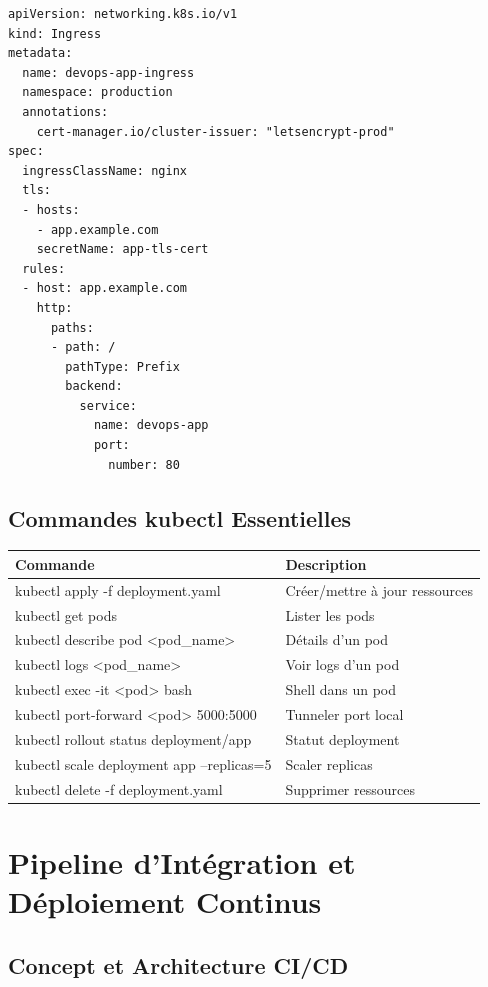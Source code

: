 \documentclass[12pt,a4paper]{report}
\begin{document}
\lstset{language=yaml}
\begin{lstlisting}
apiVersion: networking.k8s.io/v1
kind: Ingress
metadata:
  name: devops-app-ingress
  namespace: production
  annotations:
    cert-manager.io/cluster-issuer: "letsencrypt-prod"
spec:
  ingressClassName: nginx
  tls:
  - hosts:
    - app.example.com
    secretName: app-tls-cert
  rules:
  - host: app.example.com
    http:
      paths:
      - path: /
        pathType: Prefix
        backend:
          service:
            name: devops-app
            port:
              number: 80
\end{lstlisting}

\section{Commandes kubectl Essentielles}

\begin{table}[H]
\centering
\begin{tabularx}{\linewidth}{|l|X|}
\hline
\textbf{Commande} & \textbf{Description} \\
\hline
kubectl apply -f deployment.yaml & Créer/mettre à jour ressources \\
kubectl get pods & Lister les pods \\
kubectl describe pod <pod\_name> & Détails d'un pod \\
kubectl logs <pod\_name> & Voir logs d'un pod \\
kubectl exec -it <pod> bash & Shell dans un pod \\
kubectl port-forward <pod> 5000:5000 & Tunneler port local \\
kubectl rollout status deployment/app & Statut deployment \\
kubectl scale deployment app --replicas=5 & Scaler replicas \\
kubectl delete -f deployment.yaml & Supprimer ressources \\
\hline
\end{tabularx}
\end{table}

\newpage

\chapter{Pipeline d'Intégration et Déploiement Continus}

\section{Concept et Architecture CI/CD}
\end{document}
